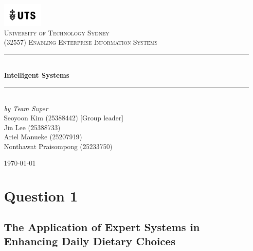 \documentclass[12pt,a4paper]{article}
\begin{document}

\begin{titlepage}

\newcommand{\HRule}{\rule{\linewidth}{0.5mm}}
\center

\vspace*{1\baselineskip}
\includegraphics[width=0.15\textwidth]{images/UTS.png}\\
\textsc{\LARGE University of Technology Sydney}\\[2.0cm]
\textsc{\Large (32557) Enabling Enterprise Information Systems}\\[0.2cm]

\HRule\\[0.6cm]
{\huge\bfseries Intelligent Systems}\\[0.4cm]
\HRule\\[10cm]

\emph{by Team Super} \\
{ Seoyoon Kim (25388442) [Group leader] \\}
{ Jin Lee (25388733)  \\}
{ Ariel Manueke (25207919) \\}
{ Nonthawat Praisompong (25233750) \\}

\vfill
{\large\today}

\vfill

\end{titlepage}


\tableofcontents
\thispagestyle{nofooter}
\cleardoublepage

\pagebreak





\setcounter{page}{1}

\section{Question 1}
\subsection{The Application of Expert Systems in Enhancing Daily Dietary Choices}
\label{sec:Question 1}
\end{document}
